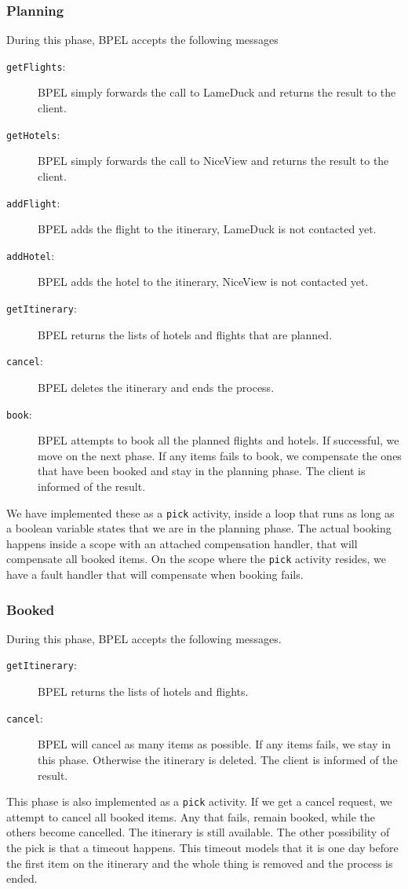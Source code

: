 \subsubsection{Planning}
During this phase, BPEL accepts the following messages


\begin{description}
\item [\texttt{getFlights}:] BPEL simply forwards the call to LameDuck and returns the result to the client.
\item [\texttt{getHotels}:] BPEL simply forwards the call to NiceView and returns the result to the client.
\item [\texttt{addFlight}:] BPEL adds the flight to the itinerary, LameDuck is not contacted yet.
\item [\texttt{addHotel}:] BPEL adds the hotel to the itinerary, NiceView is not contacted yet.
\item [\texttt{getItinerary}:] BPEL returns the lists of hotels and flights that are planned.
\item [\texttt{cancel}:] BPEL deletes the itinerary and ends the process.
\item [\texttt{book}:] BPEL attempts to book all the planned flights and hotels. If successful, we move on the next phase. If any items fails to book, we compensate the ones that have been booked and stay in the planning phase. The client is informed of the result.
\end{description}

We have implemented these as a \texttt{pick} activity, inside a loop that runs as long as a boolean variable states that we are in the planning phase. The actual booking happens inside a scope with an attached compensation handler, that will compensate all booked items. On the scope where the \texttt{pick} activity resides, we have a fault handler that will compensate when booking fails.

\subsubsection{Booked}
During this phase, BPEL accepts the following messages.


\begin{description}
\item [\texttt{getItinerary}:] BPEL returns the lists of hotels and flights.
\item [\texttt{cancel}:] BPEL will cancel as many items as possible. If any items fails, we stay in this phase. Otherwise the itinerary is deleted. The client is informed of the result.
\end{description}

This phase is also implemented as a \texttt{pick} activity. If we get a cancel request, we attempt to cancel all booked items. Any that fails, remain booked, while the others become cancelled. The itinerary is still available. The other possibility of the pick is that a timeout happens. This timeout models that it is one day before the first item on the itinerary and the whole thing is removed and the process is ended.